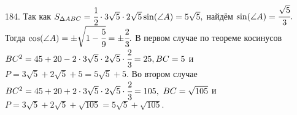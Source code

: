 184. Так как $S_{\Delta ABC}=\cfrac{1}{2}\cdot3\sqrt{5}\cdot2\sqrt{5}\sin(\angle A)=5\sqrt{5},$ найдём $\sin(\angle A)=\cfrac{\sqrt{5}}{3}.$ Тогда $\cos(\angle A)=\pm\sqrt{1-\cfrac{5}{9}}=\pm\cfrac{2}{3}.$ В первом случае по теореме косинусов $BC^2=45+20-2\cdot3\sqrt{5}\cdot2\sqrt{5}\cdot\cfrac{2}{3}=25, BC=5$ и
$P=3\sqrt{5}+2\sqrt{5}+5=5\sqrt{5}+5.$ Во втором случае $BC^2=45+20+2\cdot3\sqrt{5}\cdot2\sqrt{5}\cdot\cfrac{2}{3}=105,\ BC=\sqrt{105}$ и $P=3\sqrt{5}+2\sqrt{5}+\sqrt{105}=5\sqrt{5}+\sqrt{105}.$\\
